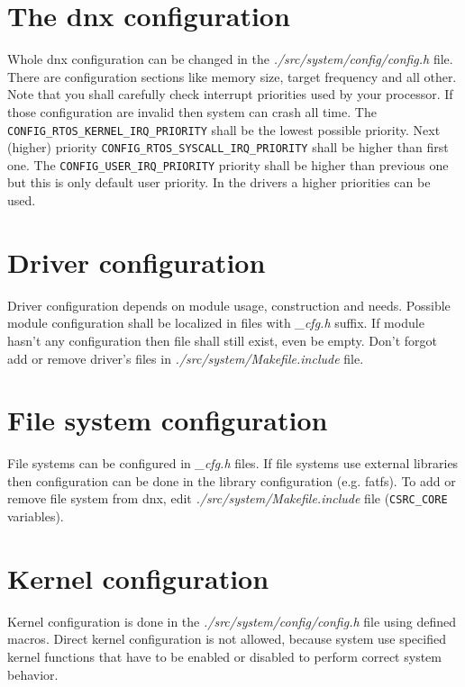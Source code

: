 \documentclass[a4paper,11pt]{report}
\renewcommand{\path}[1]{\textit{#1}}
\newcommand{\macro}[1]{\texttt{#1}}
\newcommand{\code}[1]{\texttt{#1}}
\begin{document}
\section{The dnx configuration}
Whole dnx configuration can be changed in the \path{./src/system/config/config.h} file. There are
configuration sections like memory size, target frequency and all other. Note that you
shall carefully check interrupt priorities used by your processor. If those configuration are
invalid then system can crash all time. The \macro{CONFIG\_RTOS\_KERNEL\_IRQ\_PRIORITY} shall be the
lowest possible priority. Next (higher) priority \macro{CONFIG\_RTOS\_SYSCALL\_IRQ\_PRIORITY} shall
be higher than first one. The \macro{CONFIG\_USER\_IRQ\_PRIORITY} priority shall be higher than
previous one but this is only default user priority. In the drivers a higher priorities can be used.

\section{Driver configuration}
Driver configuration depends on module usage, construction and needs. Possible module configuration
shall be localized in files with \path{\_cfg.h} suffix. If module hasn't any configuration then
file shall still exist, even be empty. Don't forgot add or remove driver's files in
\path{./src/system/Makefile.include} file.

\section{File system configuration}
File systems can be configured in \path{\_cfg.h} files. If file systems use external libraries then
configuration can be done in the library configuration (e.g. fatfs). To add or remove file system
from dnx, edit \path{./src/system/Makefile.include} file (\code{CSRC\_CORE} variables).

\section{Kernel configuration}
Kernel configuration is done in the \path{./src/system/config/config.h} file using defined macros.
Direct kernel configuration is not allowed, because system use specified kernel functions that have
to be enabled or disabled to perform correct system behavior.

\end{document}
